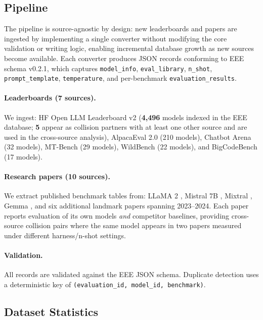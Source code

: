\documentclass[11pt]{article}
\begin{document}
\subsection{Pipeline}

The pipeline is source-agnostic by design: new leaderboards and
papers are ingested by implementing a single converter without
modifying the core validation or writing logic, enabling incremental
database growth as new sources become available.
Each converter produces JSON records conforming to EEE schema v0.2.1,
which captures \texttt{model\_info}, \texttt{eval\_library},
\texttt{n\_shot}, \texttt{prompt\_template}, \texttt{temperature},
and per-benchmark \texttt{evaluation\_results}.

\paragraph{Leaderboards (7 sources).}
We ingest: HF Open LLM Leaderboard v2 (\textbf{4,496} models indexed in the
EEE database; \textbf{5} appear as collision partners with at least
one other source and are used in the cross-source analysis),
AlpacaEval 2.0 (210 models), Chatbot Arena
(32 models), MT-Bench (29 models), WildBench (22 models), and
BigCodeBench (17 models).

\paragraph{Research papers (10 sources).}
We extract published benchmark tables from: LLaMA 2
\citep{touvron-2023-llama2}, Mistral 7B \citep{jiang-2023-mistral},
Mixtral \citep{jiang-2024-mixtral}, Gemma \citep{team-2024-gemma},
and six additional landmark papers spanning 2023--2024.
Each paper reports evaluation of its own models \emph{and} competitor
baselines, providing cross-source collision pairs where the same model
appears in two papers measured under different harness/n-shot settings.

\paragraph{Validation.}
All records are validated against the EEE JSON schema.
Duplicate detection uses a deterministic key of
\texttt{(evaluation\_id, model\_id, benchmark)}.

\subsection{Dataset Statistics}
\end{document}
